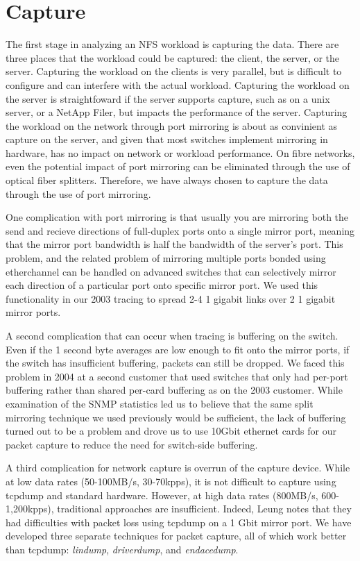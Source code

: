 \section{Capture}

The first stage in analyzing an NFS workload is capturing the data.
There are three places that the workload could be captured: the
client, the server, or the server.  Capturing the workload on the
clients is very parallel, but is difficult to configure and can
interfere with the actual workload.  Capturing the workload on the
server is straightfoward if the server supports capture, such as on a
unix server, or a NetApp Filer, but impacts the performance of the
server.  Capturing the workload on the network through port mirroring
is about as convinient as capture on the server, and given that most
switches implement mirroring in hardware, has no impact on network or
workload performance.  On fibre networks, even the potential impact of
port mirroring can be eliminated through the use of optical fiber
splitters. Therefore, we have always chosen to capture the
data through the use of port mirroring.

One complication with port mirroring is that usually you are mirroring
both the send and recieve directions of full-duplex ports onto a
single mirror port, meaning that the mirror port bandwidth is half the
bandwidth of the server's port.  This problem, and the related problem
of mirroring multiple ports bonded using etherchannel can be handled
on advanced switches that can selectively mirror each direction of a
particular port onto specific mirror port.  We used this functionality
in our 2003 tracing to spread 2-4 1 gigabit links over 2 1 gigabit
mirror ports.

A second complication that can occur when tracing is buffering on the
switch.  Even if the 1 second byte averages are low enough to fit onto
the mirror ports, if the switch has insufficient buffering, packets
can still be dropped.  We faced this problem in 2004 at a second
customer that used switches that only had per-port buffering rather
than shared per-card buffering as on the 2003 customer.  While
examination of the SNMP statistics led us to believe that the same
split mirroring technique we used previously would be sufficient, the
lack of buffering turned out to be a problem and drove us to use
10Gbit ethernet cards for our packet capture to reduce the need for
switch-side buffering.

A third complication for network capture is overrun of the capture
device.  While at low data rates (50-100MB/s, 30-70kpps), it is not
difficult to capture using tcpdump and standard hardware.  However, at
high data rates (800MB/s, 600-1,200kpps), traditional approaches are
insufficient. Indeed, Leung\cite{LeungUsenix08} notes that they 
had difficulties with packet loss using tcpdump on a 1 Gbit mirror
port.  We have developed three separate techniques for packet capture,
all of which work better than tcpdump: {\it lindump}, {\it
driverdump}, and {\it endacedump}.

